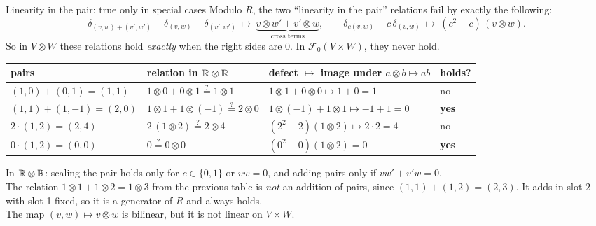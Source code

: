 \documentclass[aspectratio=1610,11pt]{beamer}
\begin{document}
\begin{frame}{Linearity in the pair: true only in special cases}
    \small
    Modulo $R$, the two ``linearity in the pair'' relations fail by exactly the following:
    \[\delta_{(v, w) + (v', w')} - \delta_{(v, w)} - \delta_{(v', w')} \ \mapsto\ \underbrace{v \otimes w' + v' \otimes w}_{\text{cross terms}}, \qquad \delta_{c(v, w)} - c\,\delta_{(v, w)} \ \mapsto\ (c^2 - c)\,(v \otimes w).\]
    So in $V \otimes W$ these relations hold \emph{exactly} when the right sides are $0$. In $\mathcal{F}_0(V \times W)$, they never hold.
    \begin{center}
        \renewcommand{\arraystretch}{1.15}
        \begin{tabular}{l|l|l|l}
            pairs & relation in $\mathbb{R} \otimes \mathbb{R}$ & defect $\mapsto$ image under $a \otimes b \mapsto ab$ & holds? \\ \hline
            $(1, 0) + (0, 1) = (1, 1)$ & $1 \otimes 0 + 0 \otimes 1 \overset{?}{=} 1 \otimes 1$ & $1 \otimes 1 + 0 \otimes 0 \mapsto 1 + 0 = 1$ & no \\
            $(1, 1) + (1, -1) = (2, 0)$ & $1 \otimes 1 + 1 \otimes (-1) \overset{?}{=} 2 \otimes 0$ & $1 \otimes (-1) + 1 \otimes 1 \mapsto -1 + 1 = 0$ & \textbf{yes} \\
            $2 \cdot (1, 2) = (2, 4)$ & $2\,(1 \otimes 2) \overset{?}{=} 2 \otimes 4$ & $(2^2 - 2)(1 \otimes 2) \mapsto 2 \cdot 2 = 4$ & no \\
            $0 \cdot (1, 2) = (0, 0)$ & $0 \overset{?}{=} 0 \otimes 0$ & $(0^2 - 0)(1 \otimes 2) = 0$ & \textbf{yes}
        \end{tabular}
    \end{center}
    In $\mathbb{R} \otimes \mathbb{R}$: scaling the pair holds only for $c \in \{0, 1\}$ or $vw = 0$, and adding pairs only if $vw' + v'w = 0$.
    \\[0.4em]
    The relation $1 \otimes 1 + 1 \otimes 2 = 1 \otimes 3$ from the previous table is \emph{not} an addition of pairs, since $(1, 1) + (1, 2) = (2, 3)$. It adds in slot 2 with slot 1 fixed, so it is a generator of $R$ and always holds.
    \\[0.4em]
    The map $(v, w) \mapsto v \otimes w$ is bilinear, but it is not linear on $V \times W$.
\end{frame}
\end{document}
